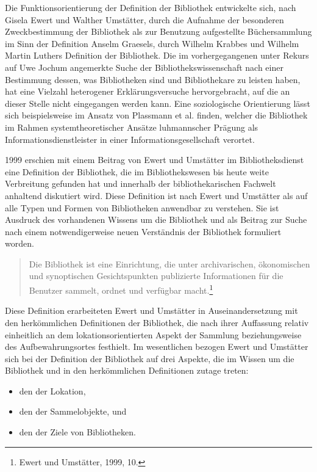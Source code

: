 \documentclass[a4paper,
fontsize=11pt,
oneside,
numbers=noperiodatend,
parskip=half-,
bibliography=totoc,
final
]{scrartcl}
\begin{document}
Die Funktionsorientierung der Definition der Bibliothek entwickelte
sich, nach Gisela Ewert und Walther Umstätter, durch die Aufnahme der
besonderen Zweckbestimmung der Bibliothek als zur Benutzung aufgestellte
Büchersammlung im Sinn der Definition Anselm Graesels, durch Wilhelm
Krabbes und Wilhelm Martin Luthers Definition der Bibliothek. Die im
vorhergegangenen unter Rekurs auf Uwe Jochum angemerkte Suche der
Bibliothekswissenschaft nach einer Bestimmung dessen, was Bibliotheken
sind und Bibliothekare zu leisten haben, hat eine Vielzahl heterogener
Erklärungsversuche hervorgebracht, auf die an dieser Stelle nicht
eingegangen werden kann. Eine soziologische Orientierung lässt sich
beispielsweise im Ansatz von Plassmann et al. finden, welcher die
Bibliothek im Rahmen systemtheoretischer Ansätze luhmannscher Prägung
als Informationsdienstleister in einer Informationsgesellschaft
verortet.

1999 erschien mit einem Beitrag von Ewert und Umstätter im
Bibliotheksdienst eine Definition der Bibliothek, die im
Bibliothekswesen bis heute weite Verbreitung gefunden hat und innerhalb
der bibliothekarischen Fachwelt anhaltend diskutiert wird. Diese
Definition ist nach Ewert und Umstätter als auf alle Typen und Formen
von Bibliotheken anwendbar zu verstehen. Sie ist Ausdruck des
vorhandenen Wissens um die Bibliothek und als Beitrag zur Suche nach
einem notwendigerweise neuen Verständnis der Bibliothek formuliert
worden.

\begin{quote}
Die Bibliothek ist eine Einrichtung, die unter archivarischen,
ökonomischen und synoptischen Gesichtspunkten publizierte Informationen
für die Benutzer sammelt, ordnet und verfügbar macht.\footnote{Ewert und
  Umstätter, 1999, 10.}
\end{quote}

Diese Definition erarbeiteten Ewert und Umstätter in Auseinandersetzung
mit den herkömmlichen Definitionen der Bibliothek, die nach ihrer
Auffassung relativ einheitlich an dem lokationsorientierten Aspekt der
Sammlung beziehungsweise des Aufbewahrungsortes festhielt. Im
wesentlichen bezogen Ewert und Umstätter sich bei der Definition der
Bibliothek auf drei Aspekte, die im Wissen um die Bibliothek und in den
herkömmlichen Definitionen zutage treten:

\begin{itemize}
\tightlist
\item
  den der Lokation,
\item
  den der Sammelobjekte, und
\item
  den der Ziele von Bibliotheken.
\end{itemize}
\end{document}
